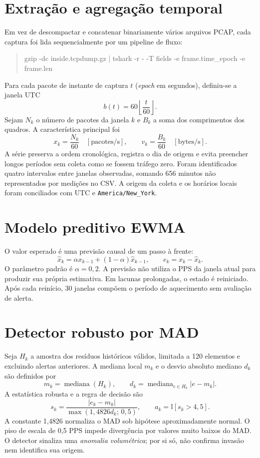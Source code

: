 \documentclass[12pt,oneside,a4paper,brazil]{abntex2}
\begin{document}
\section{Extração e agregação temporal}
Em vez de descompactar e concatenar binariamente vários arquivos PCAP, cada captura foi lida sequencialmente por um pipeline de fluxo:
\begin{quote}\ttfamily\small gzip -dc inside.tcpdump.gz | tshark -r - -T fields -e frame.time\_epoch -e frame.len\end{quote}
Para cada pacote de instante de captura $t$ (\textit{epoch} em segundos), definiu-se a janela UTC
\begin{equation}
  b(t)=60\left\lfloor\frac{t}{60}\right\rfloor.
\end{equation}
Sejam $N_k$ o número de pacotes da janela $k$ e $B_k$ a soma dos comprimentos dos quadros. A característica principal foi
\begin{equation}
 x_k = \frac{N_k}{60}\quad [\text{pacotes/s}],\qquad v_k=\frac{B_k}{60}\quad [\text{bytes/s}].
\end{equation}
A série preserva a ordem cronológica, registra o dia de origem e evita preencher longos períodos sem coleta como se fossem tráfego zero. Foram identificados quatro intervalos entre janelas observadas, somando 656 minutos não representados por medições no CSV. A origem da coleta e os horários locais foram conciliados com UTC e \texttt{America/New\_York}.

\section{Modelo preditivo EWMA}
O valor esperado é uma previsão causal de um passo à frente:
\begin{equation}
 \widehat{x}_k=\alpha x_{k-1}+(1-\alpha)\widehat{x}_{k-1},\qquad e_k=x_k-\widehat{x}_k.
\end{equation}
O parâmetro padrão é $\alpha=0{,}2$. A previsão não utiliza o PPS da janela atual para produzir sua própria estimativa. Em lacunas prolongadas, o estado é reiniciado. Após cada reinício, 30 janelas compõem o período de aquecimento sem avaliação de alerta.

\section{Detector robusto por MAD}
Seja $H_k$ a amostra dos resíduos históricos válidos, limitada a 120 elementos e excluindo alertas anteriores. A mediana local $m_k$ e o desvio absoluto mediano $d_k$ são definidos por
\begin{equation}
 m_k=\operatorname{mediana}(H_k),\qquad d_k=\operatorname{mediana}_{e\in H_k}|e-m_k|.
\end{equation}
A estatística robusta e a regra de decisão são
\begin{equation}
 s_k=\frac{|e_k-m_k|}{\max(1{,}4826d_k;\,0{,}5)},\qquad a_k=\mathbb{I}[s_k>4{,}5].
\end{equation}
A constante 1,4826 normaliza o MAD sob hipótese aproximadamente normal. O piso de escala de 0,5 PPS impede divergência por valores muito baixos do MAD. O detector sinaliza uma \emph{anomalia volumétrica}; por si só, não confirma invasão nem identifica sua origem.
\end{document}
